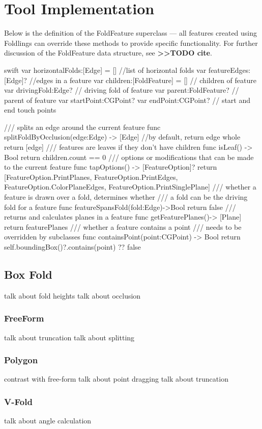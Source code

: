 \section{Tool Implementation}\label{tool-implementation}

Below is the definition of the FoldFeature superclass --- all features
created using Foldlings can override these methods to provide specific
functionality. For further discussion of the FoldFeature data structure,
see \textbf{\textgreater{}\textgreater{}TODO cite}.

\singlespacing 

\begin{pygmented}{swift}
var horizontalFolds:[Edge] = [] //list of horizontal folds
var featureEdges:[Edge]?        //edges in a feature
var children:[FoldFeature] = [] // children of feature
var drivingFold:Edge? // driving fold of feature
var parent:FoldFeature? // parent of feature
var startPoint:CGPoint?
var endPoint:CGPoint? // start and end touch points

/// splits an edge around the current feature
func splitFoldByOcclusion(edge:Edge) -> [Edge]
{
//by default, return edge whole
return [edge]
}
/// features are leaves if they don't have children
func isLeaf() -> Bool
{
return children.count == 0
}
/// options or modifications that can be made to the current feature
func tapOptions() -> [FeatureOption]?
{
  return [FeatureOption.PrintPlanes, FeatureOption.PrintEdges,
  FeatureOption.ColorPlaneEdges, FeatureOption.PrintSinglePlane]
}
/// whether a feature is drawn over a fold, determines whether 
/// a fold can be the driving fold for a feature
  func featureSpansFold(fold:Edge)->Bool
{
  return false
}
/// returns and calculates planes in a feature
func getFeaturePlanes()-> [Plane]{
  return featurePlanes
}
/// whether a feature contains a point
/// needs to be overridden by subclasses
func containsPoint(point:CGPoint) -> Bool{
  return self.boundingBox()?.contains(point) ?? false
}
\end{pygmented}

\doublespacing

\subsection{Box Fold}\label{box-fold}

talk about fold heights talk about occlusion

\subsubsection{FreeForm}\label{freeform}

talk about truncation talk about splitting

\subsubsection{Polygon}\label{polygon}

contrast with free-form talk about point dragging talk about truncation

\subsubsection{V-Fold}\label{v-fold}

talk about angle calculation

